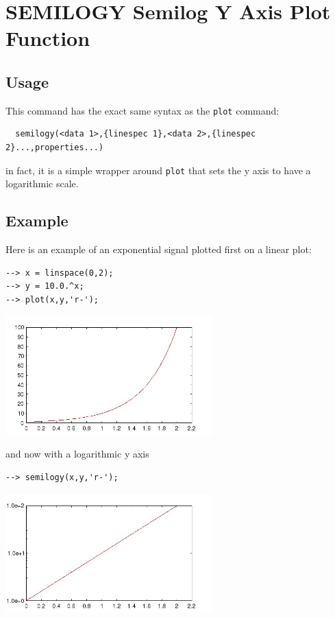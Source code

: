 \section{SEMILOGY Semilog Y Axis Plot Function}

\subsection{Usage}

This command has the exact same syntax as the \verb|plot| command:
\begin{verbatim}
  semilogy(<data 1>,{linespec 1},<data 2>,{linespec 2}...,properties...)
\end{verbatim}
in fact, it is a simple wrapper around \verb|plot| that sets the
y axis to have a logarithmic scale.
\subsection{Example}

Here is an example of an exponential signal plotted first on a linear
plot:
\begin{verbatim}
--> x = linspace(0,2);
--> y = 10.0.^x;
--> plot(x,y,'r-');
\end{verbatim}


\centerline{\includegraphics[width=8cm]{semilogy1}}

and now with a logarithmic y axis
\begin{verbatim}
--> semilogy(x,y,'r-');
\end{verbatim}


\centerline{\includegraphics[width=8cm]{semilogy2}}

